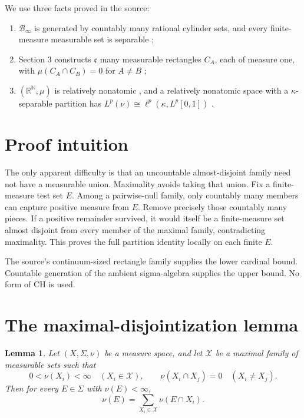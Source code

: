 \documentclass[11pt]{article}
\newtheorem{lemma}[theorem]{Lemma}
\newcommand{\R}{\mathbb R}
\newcommand{\N}{\mathbb N}
\newcommand{\cB}{\mathcal B}
\newcommand{\cX}{\mathcal X}
\newcommand{\fc}{\mathfrak c}
\begin{document}
We use three facts proved in the source:
\begin{enumerate}
\item $\cB_\infty$ is generated by countably many rational cylinder sets, and
every finite-measure measurable set is separable
\cite[Lemma 2.3]{source};
\item Section 3 constructs $\fc$ many measurable rectangles $C_A$, each of
measure one, with $\mu(C_A\cap C_B)=0$ for $A\ne B$
\cite[proof of the main theorem of Section 3]{source};
\item $(\R^{\N},\mu)$ is relatively nonatomic
\cite[Appendix A]{source}, and a relatively nonatomic space with a
$\kappa$-separable partition has
$L^p(\nu)\cong\ell^p(\kappa,L^p[0,1])$
\cite[Theorem 4.3]{source}.
\end{enumerate}

\section{Proof intuition}

The only apparent difficulty is that an uncountable almost-disjoint family
need not have a measurable union.  Maximality avoids taking that union.  Fix
a finite-measure test set $E$.  Among a pairwise-null family, only countably
many members can capture positive measure from $E$.  Remove precisely those
countably many pieces.  If a positive remainder survived, it would itself be
a finite-measure set almost disjoint from every member of the maximal family,
contradicting maximality.  This proves the full partition identity locally on
each finite $E$.

The source's continuum-sized rectangle family supplies the lower cardinal
bound.  Countable generation of the ambient sigma-algebra supplies the upper
bound.  No form of CH is used.

\section{The maximal-disjointization lemma}

\begin{lemma}\label{lem:maximal}
Let $(X,\Sigma,\nu)$ be a measure space, and let $\cX$ be a maximal family of
measurable sets such that
\[
 0<\nu(X_i)<\infty\quad(X_i\in\cX),
 \qquad \nu(X_i\cap X_j)=0\quad(X_i\ne X_j).
\]
Then for every $E\in\Sigma$ with $\nu(E)<\infty$,
\[
 \nu(E)=\sum_{X_i\in\cX}\nu(E\cap X_i).                   \tag{3}
\]
\end{lemma}
\end{document}
